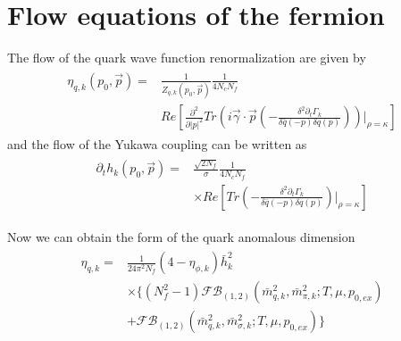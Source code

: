 \documentclass[%
reprint,
superscriptaddress,
showpacs,preprintnumbers,
 amsmath,amssymb,
 aps,
prd,
]{revtex4-1}
\begin{document}
\section{Flow equations of the fermion}\label{c}
The flow of the quark wave function renormalization are given by
\begin{align}
\begin{split}
\eta_{q,k}(p_0,\vec{p})=&\frac{1}{Z_{q,k}(p_0,\vec{p})}\frac{1}{4N_cN_f}\\
&Re\left[\frac{\partial^2}{\partial|p|^2}Tr\left( i\vec{\gamma}\cdot \vec{p}\left( -\frac{\delta^2\partial_t\Gamma_k}
{\delta\bar{q}(-p)\delta q(p)} \right) \right)\bigg|_{\rho=\kappa}\right]
\end{split}
\end{align} 
and the flow of the Yukawa coupling can be written as
\begin{align}
\begin{split}
\partial_th_k(p_0,\vec{p})=&\frac{\sqrt{2N_f}}{\sigma}\frac{1}{4N_cN_f}\\
&\times Re\left[ Tr\left( -\frac{\delta^2\partial_t\Gamma_k}{\delta\bar{q}(-p)\delta q(p)} \right)\bigg|_{\rho=\kappa} \right]
\end{split}
\end{align} 






Now we can obtain the form of the quark anomalous dimension
\begin{align}
\begin{split}
\eta_{q,k}=&\frac{1}{24\pi^2N_f}(4-\eta_{\phi,k})\bar{h}^{2}_{k}\\
&\times\{ (N^{2}_{f}-1)\mathcal{FB}_{(1,2)}(\bar{m}^{2}_{q,k},\bar{m}^{2}_{\pi,k};T,\mu,p_{0,ex})\\
&+\mathcal{FB}_{(1,2)}(\bar{m}^{2}_{q,k},\bar{m}^{2}_{\sigma,k};T,\mu,p_{0,ex}) \}
\end{split}
\end{align} 


\end{document}
